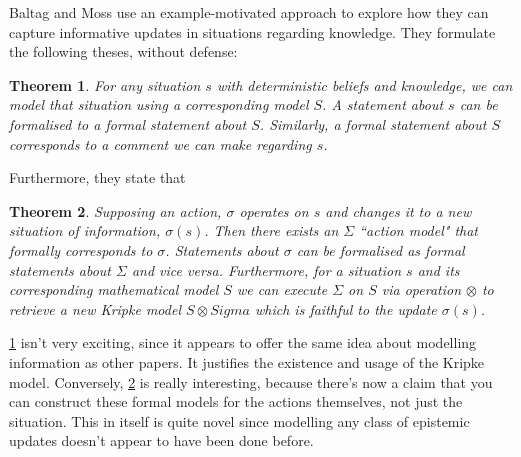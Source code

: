 \documentclass[10pt, a4paper, twoside]{article}
\newtheorem{thm}{Theorem}
\begin{document}
Baltag and Moss use an example-motivated approach to explore how they can
capture informative updates in situations regarding knowledge.
They formulate the following theses, without defense:
\begin{thm}\label{situationModel}
For any situation $s$ with deterministic beliefs and knowledge, we can model
that situation using a corresponding model $S$.
A statement about $s$ can be formalised to a formal statement about $S$.
Similarly, a formal statement about $S$ corresponds to a comment we can make
regarding $s$.
\end{thm}
Furthermore, they state that
\begin{thm}\label{actionModelExists}
Supposing an action, $\sigma$ operates on $s$ and changes it to a new situation
of information, $\sigma(s)$.
Then there exists an $\Sigma$ ``action model" that formally corresponds to
$\sigma$.
Statements about $\sigma$ can be formalised as formal statements about $\Sigma$
and vice versa.
Furthermore, for a situation $s$ and its corresponding mathematical model $S$ we
can execute $\Sigma$ on $S$ via operation $\otimes$ to retrieve a new Kripke
model $S \otimes Sigma$ which is faithful to the update $\sigma(s)$.
\end{thm}
\ref{situationModel} isn't very exciting, since it appears to offer the same
idea about modelling information as other papers.
It justifies the existence and usage of the Kripke model.
Conversely, \ref{actionModelExists} is really interesting, because there's now
a claim that you can construct these formal models for the actions themselves,
not just the situation.
This in itself is quite novel since modelling any class of epistemic updates
doesn't appear to have been done before.\\
\\
\end{document}
